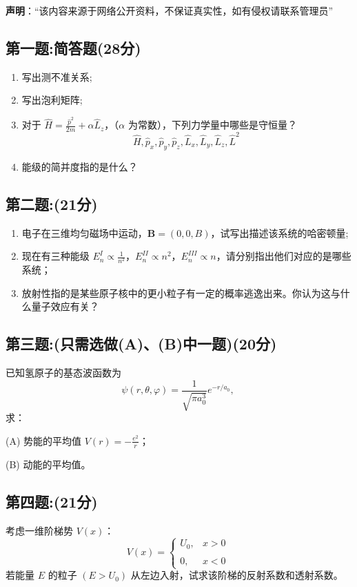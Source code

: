 
\textbf{声明}：“该内容来源于网络公开资料，不保证真实性，如有侵权请联系管理员”

\subsection{第一题:简答题(28分)}
\begin{enumerate}
    \item 写出测不准关系;
    \item 写出泡利矩阵;
    \item 对于 $\hat{H} = \frac{\hat{p}^2}{2m} + \alpha \hat{L}_z$，（$\alpha$ 为常数），下列力学量中哪些是守恒量？
    \[    \hat{H}, \hat{p}_x, \hat{p}_y, \hat{p}_z, \hat{L}_x, \hat{L}_y, \hat{L}_z, \hat{L}^2 ~\]
    \item 能级的简并度指的是什么？
\end{enumerate}
\subsection{第二题:(21分)}
\begin{enumerate}
    \item 电子在三维均匀磁场中运动，$\mathbf{B} = (0, 0, B)$，试写出描述该系统的哈密顿量;
    \item 现在有三种能级 $E_n^I \propto \frac{1}{n^2}$，$E_n^{II} \propto n^2$，$E_n^{III} \propto n$，请分别指出他们对应的是哪些系统；
    \item 放射性指的是某些原子核中的更小粒子有一定的概率逃逸出来。你认为这与什么量子效应有关？
\end{enumerate}
\subsection{第三题:(只需选做(A)、(B)中一题)(20分)}
已知氢原子的基态波函数为
\[\psi(r, \theta, \varphi) = \frac{1}{\sqrt{\pi a_0^3}} e^{-r/a_0},~\]
求：

(A) 势能的平均值 \(V(r) = -\frac{e^2}{r}\)；

(B) 动能的平均值。
\subsection{第四题:(21分)}
考虑一维阶梯势 \(V(x)\)：
\[V(x) = \begin{cases} U_0, & x > 0 \\\\0, & x < 0\end{cases}~\]
若能量 \(E\) 的粒子 \( (E > U_0) \) 从左边入射，试求该阶梯的反射系数和透射系数。
